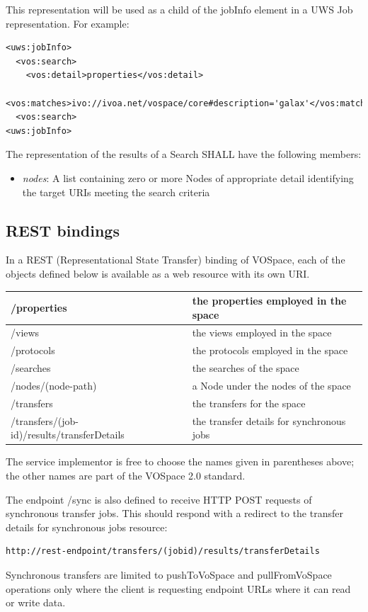 \documentclass[11pt,a4paper]{ivoa}
\begin{document}
This representation will be used as a child of the jobInfo element in a UWS Job representation. For example:

\begin{lstlisting}
<uws:jobInfo>
  <vos:search>
    <vos:detail>properties</vos:detail>
    <vos:matches>ivo://ivoa.net/vospace/core#description='galax'</vos:matches>
  <vos:search>
<uws:jobInfo>
\end{lstlisting}

The representation of the results of a Search SHALL have the following members:

\begin{itemize}
    \item \emph{nodes}: A list containing zero or more Nodes of appropriate detail identifying the target URIs meeting the search criteria
\end{itemize}

\subsection{REST bindings}
In a REST (Representational State Transfer) binding of VOSpace, each of the objects defined below is available as a web resource with its own URI.

\vspace{3mm}
\begin{tabular}{ l p{4cm} }
    \hline
    /properties & the properties employed in the space \\
    \hline
    /views & the views employed in the space \\
    \hline
    /protocols & the protocols employed in the space \\
    \hline
    /searches & the searches of the space \\
    \hline
    /nodes/(node-path) & a Node under the nodes of the space \\
    \hline
    /transfers & the transfers for the space \\
    \hline
    /transfers/(job-id)/results/transferDetails & the transfer details for synchronous jobs \\
    \hline
\end{tabular}
\vspace{3mm}

The service implementor is free to choose the names given in parentheses above; the other names are part of the VOSpace 2.0 standard.

The endpoint /sync is also defined to receive HTTP POST requests of synchronous transfer jobs. This should respond with a redirect to the transfer details for synchronous jobs resource:
\begin{verbatim}
http://rest-endpoint/transfers/(jobid)/results/transferDetails
\end{verbatim}
Synchronous transfers are limited to pushToVoSpace and pullFromVoSpace operations only where the client is requesting endpoint URLs where it can read or write data.
\end{document}
